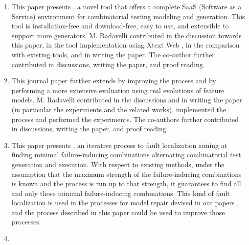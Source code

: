 \begin{enumerate}
	\item \cite{IWCTGargantini2018} 
	
	This paper presents \ctwedge, a novel tool that offers a complete SaaS (Software as a Service) environment for combinatorial testing modeling and generation. This tool is installation-free and download-free, easy to use, and extensible to support more generators.
	M. Radavelli contributed in the discussion towards this paper, in the tool implementation using Xtext Web \cite{Eysholdt:2010,xtext}, in the comparison with existing tools, and in writing the paper.
	The co-author further contributed in discussions, writing the paper, and proof reading.

	\item \cite{arcaini2019achieving} 	
	
	This journal paper further extends \cite{arcaini_evolutionary_2018} by improving the process and by performing a more extensive evaluation using real evolutions of feature models.
	M. Radavelli contributed in the discussions and in writing the paper (in particular the experiments and the related works), implemented the process and performed the experiments.
	The co-authors further contributed in discussions, writing the paper, and proof reading.
	
	\item \cite{iwct19} 

	This paper presents \mix, an iterative process to fault localization aiming at finding minimal failure-inducing combinations alternating combinatorial test generation and execution. With respect to existing methods, under the assumption that the maximum strength of the failure-inducing combinations is known and the process is run up to that strength, it guarantees to find all and only those minimal failure-inducing combinations.
	This kind of fault localization is used in the processes for model repair devised in our papers \cite{gargantini_combinatorial_2017,IWCTGargantini2018,garn2019}, and the process described in this paper could be used to improve those processes.
	
		
	\item \cite{garn2019} 
	

\end{enumerate}
